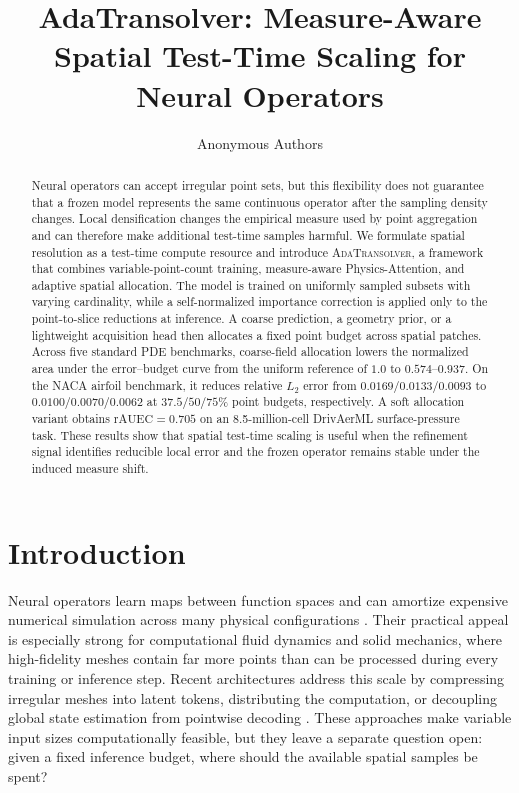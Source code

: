 \documentclass{article}
\title{AdaTransolver: Measure-Aware Spatial Test-Time Scaling for Neural Operators}
\author{Anonymous Authors}
\newcommand{\method}{\textsc{AdaTransolver}}
\newcommand{\rauec}{\mathrm{rAUEC}}
\begin{document}
\maketitle

\begin{abstract}
Neural operators can accept irregular point sets, but this flexibility does not guarantee that a frozen model represents the same continuous operator after the sampling density changes. Local densification changes the empirical measure used by point aggregation and can therefore make additional test-time samples
harmful. We formulate spatial resolution as a test-time compute resource and
introduce \method, a framework that combines variable-point-count training,
measure-aware Physics-Attention, and adaptive spatial allocation. The model is
trained on uniformly sampled subsets with varying cardinality, while a
self-normalized importance correction is applied only to the point-to-slice
reductions at inference. A coarse prediction, a geometry prior, or a lightweight
acquisition head then allocates a fixed point budget across spatial patches.
Across five standard PDE benchmarks, coarse-field allocation lowers the
normalized area under the error--budget curve from the uniform reference of
$1.0$ to $0.574$--$0.937$. On the NACA airfoil benchmark, it reduces relative
$L_2$ error from $0.0169/0.0133/0.0093$ to
$0.0100/0.0070/0.0062$ at $37.5/50/75\%$ point budgets, respectively. A
soft allocation variant obtains $\rauec=0.705$ on an 8.5-million-cell
DrivAerML surface-pressure task. These results show that spatial test-time
scaling is useful when the refinement signal identifies reducible local error
and the frozen operator remains stable under the induced measure shift.
\end{abstract}

\section{Introduction}

Neural operators learn maps between function spaces and can amortize expensive
numerical simulation across many physical configurations
\citep{li2021fno,li2023gino,wu2024transolver}. Their practical appeal is
especially strong for computational fluid dynamics and solid mechanics, where
high-fidelity meshes contain far more points than can be processed during every
training or inference step. Recent architectures address this scale by
compressing irregular meshes into latent tokens, distributing the computation,
or decoupling global state estimation from pointwise decoding
\citep{alkin2024upt,luo2025transolverpp,zhou2026transolver3}. These approaches
make variable input sizes computationally feasible, but they leave a separate
question open: given a fixed inference budget, where should the available
spatial samples be spent?
\end{document}

